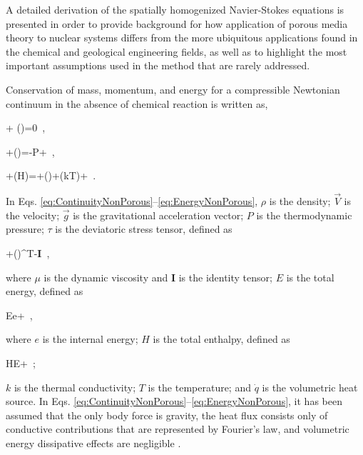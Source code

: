 A detailed derivation of the spatially homogenized Navier-Stokes equations is presented in order to provide background for how application of porous media theory to nuclear systems differs from the more ubiquitous applications found in the chemical and geological engineering fields, as well as to highlight the most important assumptions used in the method that are rarely addressed. 

Conservation of mass, momentum, and energy for a compressible Newtonian continuum in the absence of chemical reaction is written as,

\beq
\label{eq:ContinuityNonPorous}
 + \nabla\cdot(\rho{})=0\ ,
\eeq

\beq
\label{eq:NSFullForm}
+\nabla\cdot(\rho{})=\rho{}-\nabla P+\nabla\cdot\tau\ ,
\eeq

\beq
\label{eq:EnergyNonPorous}
+\nabla\cdot(\rho H)=\rho {}\cdot{}+\nabla\cdot(\tau)+\nabla\cdot(k\nabla T)+\ .
\eeq

\noindent In Eqs. \eqref{eq:ContinuityNonPorous}--\eqref{eq:EnergyNonPorous}, \(\rho\) is the density; \(\vec{V}\) is the velocity; \(\vec{g}\) is the gravitational acceleration vector; \(P\) is the thermodynamic pressure; \(\tau\) is the deviatoric stress tensor, defined as

\beq
\label{eq:TauDef}
\tau\equiv\mu\left\lbrack\nabla {}+(\nabla {})^T\right\rbrack-\nabla\cdot{}\textbf{I}\ ,
\eeq

\noindent where \(\mu\) is the dynamic viscosity and \(\textbf{I}\) is the identity tensor; \(E\) is the total energy, defined as

\beq
\label{eq:TotalEnergyDef}
E\equiv e+\cdot{}\ ,
\eeq

\noindent where \(e\) is the internal energy; \(H\) is the total enthalpy, defined as

\beq
\label{eq:TotalEnthalpyDef}
H\equiv E+\ ;
\eeq

\noindent \(k\) is the thermal conductivity; \(T\) is the temperature; and \(\dot{q}\) is the volumetric heat source. In Eqs. \eqref{eq:ContinuityNonPorous}--\eqref{eq:EnergyNonPorous}, it has been assumed that the only body force is gravity, the heat flux consists only of conductive contributions that are represented by Fourier's law, and volumetric energy dissipative effects are negligible \cite{batchelor}.

